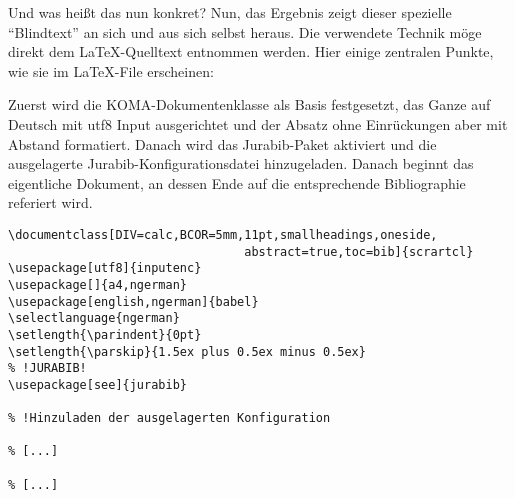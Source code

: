 Und was heißt das nun konkret? Nun, das Ergebnis zeigt dieser spezielle
"`Blindtext"' an sich und aus sich selbst heraus. Die verwendete Technik möge
direkt dem LaTeX-Quelltext entnommen werden. Hier einige zentralen Punkte, wie
sie im LaTeX-File erscheinen:

Zuerst wird die KOMA-Dokumentenklasse als Basis festgesetzt, das Ganze auf
Deutsch mit utf8 Input ausgerichtet und der Absatz ohne Einrückungen aber mit
Abstand formatiert. Danach wird das Jurabib-Paket aktiviert und die ausgelagerte
Jurabib-Konfigurationsdatei hinzugeladen. Danach beginnt das eigentliche
Dokument, an dessen Ende auf die entsprechende Bibliographie referiert wird.
\small
\begin{verbatim}
\documentclass[DIV=calc,BCOR=5mm,11pt,smallheadings,oneside,
                                 abstract=true,toc=bib]{scrartcl}
\usepackage[utf8]{inputenc}
\usepackage[]{a4,ngerman}
\usepackage[english,ngerman]{babel}
\selectlanguage{ngerman}
\setlength{\parindent}{0pt}
\setlength{\parskip}{1.5ex plus 0.5ex minus 0.5ex}
% !JURABIB!
\usepackage[see]{jurabib}

% !Hinzuladen der ausgelagerten Konfiguration

% [...]

% [...]



\end{verbatim}


